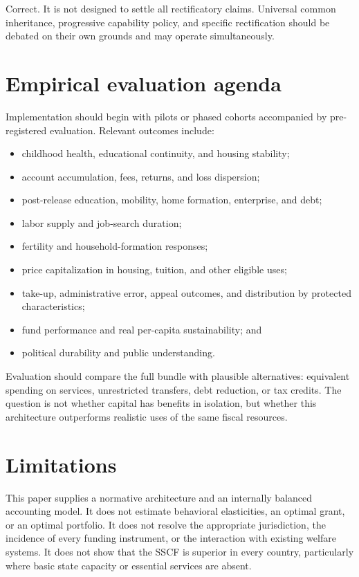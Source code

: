\documentclass[11pt]{article}
\begin{document}
Correct. It is not designed to settle all rectificatory claims. Universal common
inheritance, progressive capability policy, and specific rectification should be
debated on their own grounds and may operate simultaneously.

\section{Empirical evaluation agenda}

Implementation should begin with pilots or phased cohorts accompanied by pre-registered
evaluation. Relevant outcomes include:

\begin{itemize}
  \item childhood health, educational continuity, and housing stability;
  \item account accumulation, fees, returns, and loss dispersion;
  \item post-release education, mobility, home formation, enterprise, and debt;
  \item labor supply and job-search duration;
  \item fertility and household-formation responses;
  \item price capitalization in housing, tuition, and other eligible uses;
  \item take-up, administrative error, appeal outcomes, and distribution by protected
  characteristics;
  \item fund performance and real per-capita sustainability; and
  \item political durability and public understanding.
\end{itemize}

Evaluation should compare the full bundle with plausible alternatives: equivalent
spending on services, unrestricted transfers, debt reduction, or tax credits. The
question is not whether capital has benefits in isolation, but whether this architecture
outperforms realistic uses of the same fiscal resources.

\section{Limitations}

This paper supplies a normative architecture and an internally balanced accounting
model. It does not estimate behavioral elasticities, an optimal grant, or an optimal
portfolio. It does not resolve the appropriate jurisdiction, the incidence of every
funding instrument, or the interaction with existing welfare systems. It does not show
that the SSCF is superior in every country, particularly where basic state capacity or
essential services are absent.
\end{document}

